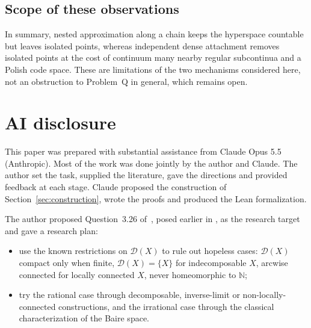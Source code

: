 \documentclass[11pt]{amsart}
\theoremstyle{definition}
\theoremstyle{remark}
\newcommand{\D}{\mathcal{D}}
\newcommand{\N}{\mathbb{N}}
\begin{document}
\subsection{Scope of these observations}
In summary, nested approximation along a chain keeps the hyperspace countable but leaves isolated points, whereas independent dense attachment removes isolated points at the cost of continuum many nearby regular subcontinua and a Polish code space. These are limitations of the two mechanisms considered here, not an obstruction to Problem~Q in general, which remains open.

\section*{AI disclosure}

This paper was prepared with substantial assistance from Claude Opus 5.5 (Anthropic). Most of the work was done jointly by the author and Claude. The author set the task, supplied the literature, gave the directions and provided feedback at each stage. Claude proposed the construction of Section~\ref{sec:construction}, wrote the proofs and produced the Lean formalization.

The author proposed Question~3.26 of~\cite{CORa}, posed earlier in \cite[Pregunta~3.2.14]{Ra}, as the research target and gave a research plan:
\begin{itemize}
\item use the known restrictions on $\D(X)$ to rule out hopeless cases: $\D(X)$ compact only when finite, $\D(X)=\{X\}$ for indecomposable $X$, arcwise connected for locally connected $X$, never homeomorphic to $\N$;
\item try the rational case through decomposable, inverse-limit or non-locally-connected constructions, and the irrational case through the classical characterization of the Baire space.
\end{itemize}
\end{document}
